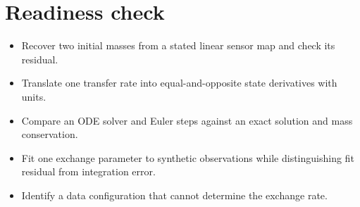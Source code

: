 \documentclass[11pt,letterpaper]{article}
\theoremstyle{definition}\newtheorem{definition}{Definition}\newtheorem{example}{Example}
\numberwithin{equation}{section}
\begin{document}
\section*{Readiness check}
\begin{itemize}
\item Recover two initial masses from a stated linear sensor map and check its residual.
\item Translate one transfer rate into equal-and-opposite state derivatives with units.
\item Compare an ODE solver and Euler steps against an exact solution and mass conservation.
\item Fit one exchange parameter to synthetic observations while distinguishing fit residual from integration error.
\item Identify a data configuration that cannot determine the exchange rate.
\end{itemize}
\end{document}
